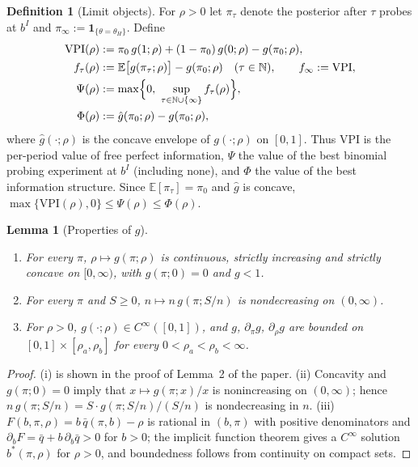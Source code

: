 \documentclass[11pt]{article}
\newtheorem{lemma}{Lemma}
\theoremstyle{definition}
\newtheorem{definition}{Definition}
\theoremstyle{remark}
\newcommand{\E}{\mathbb{E}}
\newcommand{\qbar}{\bar q}
\newcommand{\VPI}{\mathrm{VPI}}
\newcommand{\gcav}{\hat g}
\newcommand{\ind}[1]{\mathbf{1}_{#1}}
\begin{document}
\begin{definition}[Limit objects]\label{def:limit}
For $\rho>0$ let $\pi_\tau$ denote the posterior after $\tau$ probes at $b^I$ and $\pi_\infty:=\ind{\{\theta=\theta_H\}}$. Define
\begin{align*}
\VPI(\rho)&:=\pi_0\,g(1;\rho)+(1-\pi_0)\,g(0;\rho)-g(\pi_0;\rho),\\
f_\tau(\rho)&:=\E\bigl[g(\pi_\tau;\rho)\bigr]-g(\pi_0;\rho)\quad(\tau\in\mathbb N),\qquad f_\infty:=\VPI,\\
\Psi(\rho)&:=\max\Bigl\{0,\ \sup_{\tau\in\mathbb N\cup\{\infty\}} f_\tau(\rho)\Bigr\},\\
\Phi(\rho)&:=\gcav(\pi_0;\rho)-g(\pi_0;\rho),
\end{align*}
where $\gcav(\cdot;\rho)$ is the concave envelope of $g(\cdot;\rho)$ on $[0,1]$. Thus $\VPI$ is the per-period value
of free perfect information, $\Psi$ the value of the best binomial probing experiment at $b^I$ (including none), and
$\Phi$ the value of the best information structure. Since $\E[\pi_\tau]=\pi_0$ and
$\gcav$ is concave, $\max\{\VPI(\rho),0\}\le\Psi(\rho)\le\Phi(\rho)$.
\end{definition}

\begin{lemma}[Properties of $g$]\label{lem:g}
\begin{enumerate}
\item[(i)] For every $\pi$, $\rho\mapsto g(\pi;\rho)$ is continuous, strictly increasing and strictly concave on
$[0,\infty)$, with $g(\pi;0)=0$ and $g<1$.
\item[(ii)] For every $\pi$ and $S\ge0$, $n\mapsto n\,g(\pi;S/n)$ is nondecreasing on $(0,\infty)$.
\item[(iii)] For $\rho>0$, $g(\cdot;\rho)\in C^\infty([0,1])$, and $g$, $\partial_\pi g$, $\partial_\rho g$ are bounded on
$[0,1]\times[\rho_a,\rho_b]$ for every $0<\rho_a<\rho_b<\infty$.
\end{enumerate}
\end{lemma}

\begin{proof}
(i) is shown in the proof of Lemma~2 of the paper. (ii) Concavity and $g(\pi;0)=0$ imply that
$x\mapsto g(\pi;x)/x$ is nonincreasing on $(0,\infty)$; hence $n\,g(\pi;S/n)=S\cdot g(\pi;S/n)/(S/n)$ is
nondecreasing in $n$. (iii) $F(b,\pi,\rho)=b\,\qbar(\pi,b)-\rho$ is rational in $(b,\pi)$ with positive
denominators and $\partial_bF=\qbar+b\,\partial_b\qbar>0$ for $b>0$; the implicit function theorem gives a
$C^\infty$ solution $b^*(\pi,\rho)$ for $\rho>0$, and boundedness follows from continuity on compact sets.
\end{proof}
\end{document}
